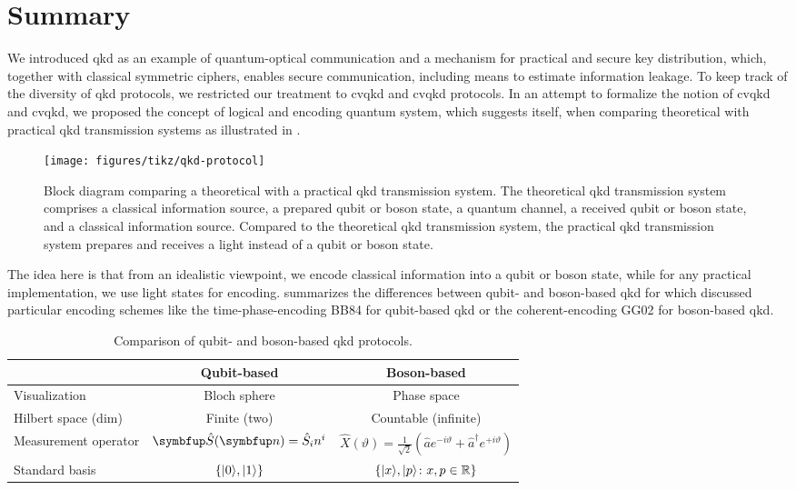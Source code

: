 \section*{Summary}

We introduced \gls{qkd} as an example of quantum-optical communication and a mechanism for practical and secure key distribution, which, together with classical symmetric ciphers, enables secure communication, including means to estimate information leakage.
To keep track of the diversity of \gls{qkd} protocols, we restricted our treatment to \gls{cvqkd} and \gls{cvqkd} protocols.
In an attempt to formalize the notion of \gls{cvqkd} and \gls{cvqkd}, we proposed the concept of logical and encoding quantum system, which suggests itself, when comparing theoretical with practical \gls{qkd} transmission systems as illustrated in .
\begin{figure}[htb]
	\centering
	\texttt{[image: figures/tikz/qkd-protocol]}
	\caption{Block diagram comparing a theoretical with a practical \gls{qkd} transmission system. The theoretical \gls{qkd} transmission system comprises a classical information source, a prepared qubit or boson state, a quantum channel, a received qubit or boson state, and a classical information source. Compared to the theoretical \gls{qkd} transmission system, the practical \gls{qkd} transmission system prepares and receives a light instead of a qubit or boson state.}\label{fig:qkd_protocol}
\end{figure}
The idea here is that from an idealistic viewpoint, we encode classical information into a qubit or boson state, while for any practical implementation, we use light states for encoding.
 summarizes the differences between qubit- and boson-based \gls{qkd} for which discussed particular encoding schemes like the time-phase-encoding BB84 for qubit-based \gls{qkd} or the coherent-encoding GG02 for boson-based \gls{qkd}.
\begin{table}[htb]
	\centering	
	\begin{tabular}{lcc}
		\toprule
			& Qubit-based & Boson-based \\
		\midrule
			Visualization & Bloch sphere & Phase space \\
			Hilbert space (dim) & Finite (two) & Countable (infinite) \\
			Measurement operator & $\vb{\hat{S}}(\vb{n})=\hat{S}_in^i$ & $\hat{X}(\vartheta)=\frac{1}{\sqrt{2}}\left(\hat{a}e^{-i\vartheta}+\hat{a}^\dagger e^{+i\vartheta}\right)$ \\
			Standard basis & $\left\{\lvert0\rangle,\lvert1\rangle\right\}$ & $\left\{\lvert x\rangle,\lvert p\rangle\colon x,p\in\mathbb{R}\right\}$ \\
		\bottomrule
	\end{tabular}
	\caption{Comparison of qubit- and boson-based \gls{qkd} protocols.}\label{tab:qkd_comparison}
\end{table}
